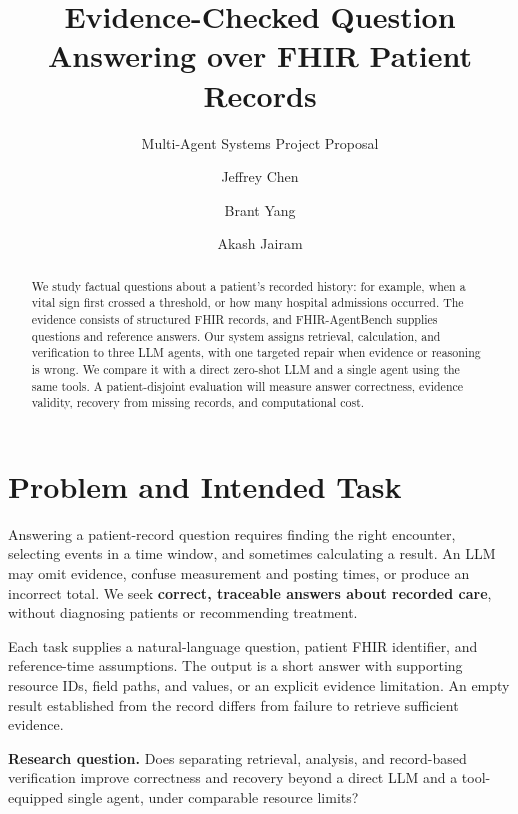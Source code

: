 \documentclass[sigconf,nonacm]{acmart}
\title{Evidence-Checked Question Answering over FHIR Patient Records}
\subtitle{Multi-Agent Systems Project Proposal}
\author{Jeffrey Chen}
\affiliation{%
  \institution{Washington University in St. Louis}
  \city{St. Louis}
  \country{USA}
}
\author{Brant Yang}
\affiliation{%
  \institution{Washington University in St. Louis}
  \city{St. Louis}
  \country{USA}
}
\author{Akash Jairam}
\affiliation{%
  \institution{Washington University in St. Louis}
  \city{St. Louis}
  \country{USA}
}
\begin{document}
\begin{abstract}
We study factual questions about a patient's recorded history: for example, when a vital sign first crossed a threshold, or how many hospital admissions occurred. The evidence consists of structured FHIR records, and FHIR-AgentBench supplies questions and reference answers. Our system assigns retrieval, calculation, and verification to three LLM agents, with one targeted repair when evidence or reasoning is wrong. We compare it with a direct zero-shot LLM and a single agent using the same tools. A patient-disjoint evaluation will measure answer correctness, evidence validity, recovery from missing records, and computational cost.
\end{abstract}

\maketitle
\fancyhead{}

\section{Problem and Intended Task}
Answering a patient-record question requires finding the right encounter, selecting events in a time window, and sometimes calculating a result. An LLM may omit evidence, confuse measurement and posting times, or produce an incorrect total. We seek \textbf{correct, traceable answers about recorded care}, without diagnosing patients or recommending treatment.

Each task supplies a natural-language question, patient FHIR identifier, and reference-time assumptions. The output is a short answer with supporting resource IDs, field paths, and values, or an explicit evidence limitation. An empty result established from the record differs from failure to retrieve sufficient evidence.

\textbf{Research question.} Does separating retrieval, analysis, and record-based verification improve correctness and recovery beyond a direct LLM and a tool-equipped single agent, under comparable resource limits?
\end{document}
